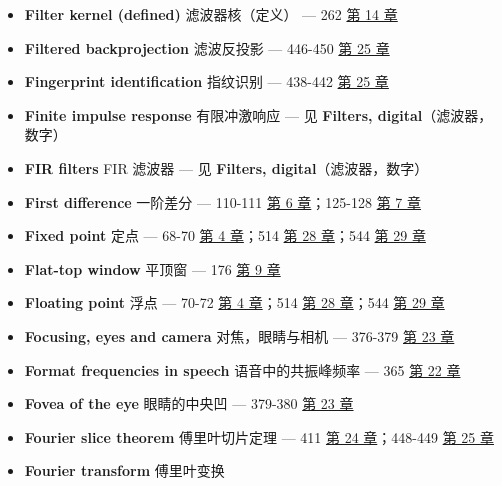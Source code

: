 \begin{itemize}
\begin{itemize}
    transfer function of：其传递函数 --- 610-616 
    \hyperref[ch-33]{第 33 章}
  \item
    z-domain representation of：其 z 域表示 --- 610-616 
    \hyperref[ch-33]{第 33 章}
  \end{itemize}
\item
  \textbf{Filter kernel (defined)} 滤波器核（定义） --- 262 
  \hyperref[ch-14]{第 14 章}
\item
  \textbf{Filtered backprojection} 滤波反投影 --- 446-450 
  \hyperref[ch-25]{第 25 章}
\item
  \textbf{Fingerprint identification} 指纹识别 --- 438-442 
  \hyperref[ch-25]{第 25 章}
\item
  \textbf{Finite impulse response} 有限冲激响应 --- 见 \textbf{Filters,
  digital}（滤波器，数字）
\item
  \textbf{FIR filters} FIR 滤波器 --- 见 \textbf{Filters,
  digital}（滤波器，数字）
\item
  \textbf{First difference} 一阶差分 --- 110-111 
  \hyperref[ch-06]{第 6 章}；125-128  \hyperref[ch-07]{第 7
  章}
\item
  \textbf{Fixed point} 定点 --- 68-70  \hyperref[ch-04]{第 4
  章}；514  \hyperref[ch-28]{第 28 章}；544 
  \hyperref[ch-29]{第 29 章}
\item
  \textbf{Flat-top window} 平顶窗 --- 176  \hyperref[ch-09]{第
  9 章}
\item
  \textbf{Floating point} 浮点 --- 70-72  \hyperref[ch-04]{第
  4 章}；514  \hyperref[ch-28]{第 28 章}；544 
  \hyperref[ch-29]{第 29 章}
\item
  \textbf{Focusing, eyes and camera} 对焦，眼睛与相机 --- 376-379
   \hyperref[ch-23]{第 23 章}
\item
  \textbf{Format frequencies in speech} 语音中的共振峰频率 --- 365
   \hyperref[ch-22]{第 22 章}
\item
  \textbf{Fovea of the eye} 眼睛的中央凹 --- 379-380 
  \hyperref[ch-23]{第 23 章}
\item
  \textbf{Fourier slice theorem} 傅里叶切片定理 --- 411 
  \hyperref[ch-24]{第 24 章}；448-449  \hyperref[ch-25]{第 25
  章}
\item
  \textbf{Fourier transform} 傅里叶变换


\end{itemize}
